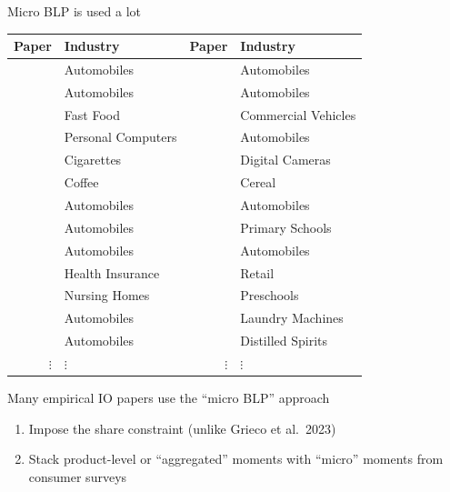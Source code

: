 \documentclass[aspectratio=169,10pt]{beamer}
\begin{document}
\begin{frame}{Micro BLP is used a lot}
    \vspace{0.5em}
    \scriptsize
    \begin{tabular}{rlrl}
        Paper & Industry & Paper & Industry \\
        \midrule
        \cite*{petrin2002quantifying} & Automobiles & \cite*{barwick2017local} & Automobiles \\
        \cite*{berry2004differentiated} & Automobiles & \cite*{murry2017advertising} & Automobiles \\
        \cite*{thomadsen2005effect} & Fast Food & \cite*{wollmann2018trucks} & Commercial Vehicles \\
        \cite*{goeree2008limited} & Personal Computers & \cite*{li2018better} & Automobiles \\
        \cite*{ciliberto2010public} & Cigarettes & \cite*{li2018empirical} & Digital Cameras \\
        \cite*{nakamura2010accounting} & Coffee & \cite*{backus2021common} & Cereal \\
        \cite*{beresteanu2011gasoline} & Automobiles & \cite*{grieco2021evolution} & Automobiles \\
        \cite*{li2012traffic} & Automobiles & \cite*{neilson2021targeted} & Primary Schools \\
        \cite*{copeland2014intertemporal} & Automobiles & \cite*{armitage2022regulatory} & Automobiles \\
        \cite*{starc2014insurer} & Health Insurance & \cite*{dopper2022rising} & Retail \\
        \cite*{ching2015quantifying} & Nursing Homes & \cite*{bodere2023dynamic} & Preschools \\
        \cite*{li2015price} & Automobiles & \cite*{montag2023mergers} & Laundry Machines \\
        \cite*{nurski2016exclusive} & Automobiles & \cite*{conlon2023market} & Distilled Spirits \\
        $\vdots$ & $\vdots$ & $\vdots$ & $\vdots$
    \end{tabular}
    \normalsize
    \vspace{0.5em}
    \begin{wideitemize}
        \item Many empirical IO papers use the ``micro BLP'' approach
        \begin{enumerate}
            \item Impose the \cite{berry1995automobile} share constraint (unlike {\color{lightgray}Grieco et al.\ 2023}) \nocite{grieco2023conformant}
            \item Stack product-level or ``\alert{aggregated}'' moments with ``\alert{micro}'' moments from consumer surveys
        \end{enumerate}
    \end{wideitemize}
\end{frame}
\end{document}
